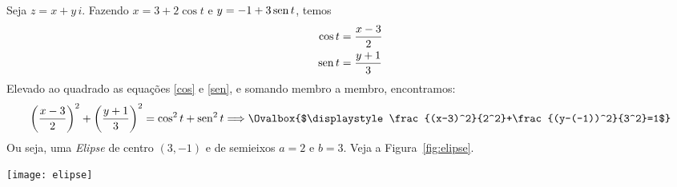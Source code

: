 \begin{solution}
	 Seja $ z = x + y\,i $.
	 Fazendo $ x = 3 + 2 \cos{t} $ e $ y = -1 + 3 \operatorname{sen}{t} $, temos
	 \begin{align}
	  \cos{t} &= \frac{x - 3}{2} \label{cos}\\
	  \operatorname{sen}{t} &= \frac{y + 1}{3} \label{sen}
	 \end{align}
	 Elevado ao quadrado as equações \eqref{cos} e \eqref{sen}, e somando 
		membro a membro, encontramos:
	 \[
			\left( \frac{x - 3}{2} \right)^2 + \left (\frac{y + 1}{3} \right)^2 =
			\cos^{2}{t} + \sen^{2}{t}
			\Longrightarrow
			\Ovalbox{$\displaystyle\frac{(x-3)^2}{2^2}+\frac{(y-(-1))^2}{3^2}=1$}
		\]
  Ou seja, uma \emph{Elipse} de centro $ (3, -1) $ e de semieixos $ a = 2 $
		e $b=3$.
	 Veja a Figura~\ref{fig:elipse}.
  
  \begin{minipage}{\textwidth}
	  \centering
	  \texttt{[image: elipse]}
	  \label{fig:elipse}
	 \end{minipage}  
\end{solution}